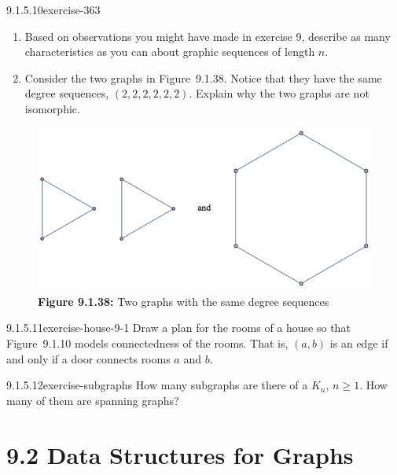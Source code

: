 \documentclass[twoside,10pt,]{book}
\numberwithin{equation}{section}
\begin{document}
\begin{divisionsolution}{9.1.5.10}{}{exercise-363}%
\hypertarget{p-3102}{}%
\leavevmode%
\begin{enumerate}[label=(\alph*)]
\item\hypertarget{li-1507}{}\hypertarget{p-3103}{}%
Based on observations you might have made in exercise 9, describe as many characteristics as you can about graphic sequences of length \(n\).%
\item\hypertarget{li-1508}{}\hypertarget{p-3104}{}%
Consider the two graphs in Figure~9.1.38. Notice that they have the same degree sequences, \((2,2,2,2,2,2)\).  Explain why the two graphs are not isomorphic.%
\end{enumerate}
%
\begin{figure}
\centering
\includegraphics[width=1\linewidth]{images/fig-same-ds-9-1.png}
\caption*{\textbf{Figure 9.1.38:} Two graphs with the same degree sequences}
\end{figure}
\end{divisionsolution}%
\begin{divisionsolution}{9.1.5.11}{}{exercise-house-9-1}%
\hypertarget{p-3105}{}%
Draw a plan for the rooms of a house so that Figure~9.1.10 models connectedness of the rooms.  That is, \((a,b)\) is an edge if and only if a door connects rooms \(a\) and \(b\).%
\end{divisionsolution}%
\begin{divisionsolution}{9.1.5.12}{}{exercise-subgraphs}%
\hypertarget{p-3106}{}%
How many subgraphs are there of a \(K_n\), \(n \geq 1\).  How many of them are spanning graphs?%
\end{divisionsolution}%
\section*{9.2 Data Structures for Graphs}
\end{document}
